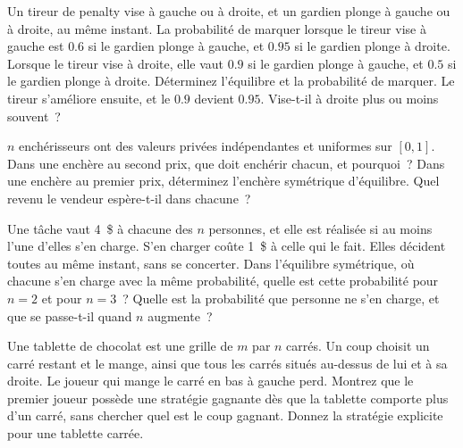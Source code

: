 \begin{question}\label{iq:iv1:games:10}
Un tireur de penalty vise à gauche ou à droite, et un gardien plonge à gauche ou à droite, au même instant. La probabilité de marquer lorsque le tireur vise à gauche est $0.6$ si le gardien plonge à gauche, et $0.95$ si le gardien plonge à droite. Lorsque le tireur vise à droite, elle vaut $0.9$ si le gardien plonge à gauche, et $0.5$ si le gardien plonge à droite. Déterminez l'équilibre et la probabilité de marquer. Le tireur s'améliore ensuite, et le $0.9$ devient $0.95$. Vise-t-il à droite plus ou moins souvent~?
\end{question}

\begin{question}\label{iq:iv1:games:11}
$n$ enchérisseurs ont des valeurs privées indépendantes et uniformes sur $[0, 1]$. Dans une enchère au second prix, que doit enchérir chacun, et pourquoi~? Dans une enchère au premier prix, déterminez l'enchère symétrique d'équilibre. Quel revenu le vendeur espère-t-il dans chacune~?
\end{question}

\begin{question}\label{iq:iv1:games:12}
Une tâche vaut 4~\$ à chacune des $n$ personnes, et elle est réalisée si au moins l'une d'elles s'en charge. S'en charger coûte 1~\$ à celle qui le fait. Elles décident toutes au même instant, sans se concerter. Dans l'équilibre symétrique, où chacune s'en charge avec la même probabilité, quelle est cette probabilité pour $n = 2$ et pour $n = 3$~? Quelle est la probabilité que personne ne s'en charge, et que se passe-t-il quand $n$ augmente~?
\end{question}

\begin{question}\label{iq:iv1:games:13}
Une tablette de chocolat est une grille de $m$ par $n$ carrés. Un coup choisit un carré restant et le mange, ainsi que tous les carrés situés au-dessus de lui et à sa droite. Le joueur qui mange le carré en bas à gauche perd. Montrez que le premier joueur possède une stratégie gagnante dès que la tablette comporte plus d'un carré, sans chercher quel est le coup gagnant. Donnez la stratégie explicite pour une tablette carrée.
\end{question}


